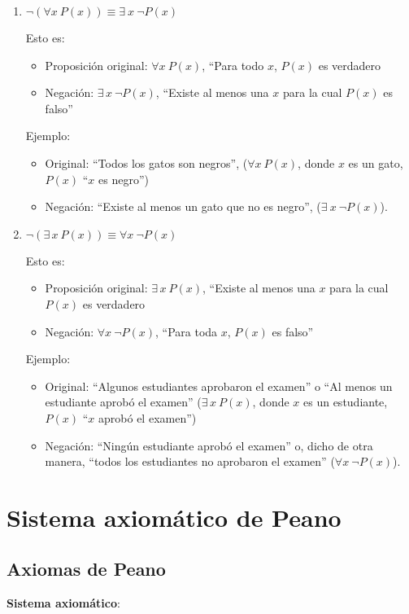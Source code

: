\begin{enumerate}[label=\roman*)]
	\item $\neg \left( \forall x \ P(x) \right) \equiv \exists \ x \ \neg P(x)$
	
	Esto es:
	\begin{itemize}
		\item Proposición original: $\forall x \ P(x)$, ``Para todo $x$, $P(x)$ es verdadero
		\item Negación: $\exists \, x \ \neg P(x)$, ``Existe al menos una $x$ para la cual $P(x)$ es falso''
	\end{itemize}
	Ejemplo:
	\begin{itemize}
		\item Original: ``Todos los gatos son negros'', ($\forall x \ P(x)$, donde $x$ es un gato, $P(x)$ ``$x$ es negro'')
		\item Negación: ``Existe al menos un gato que no es negro'', ($\exists \ x \ \neg P(x)$).
	\end{itemize}
	\item $\neg \left( \exists \, x \ P(x) \right) \equiv \forall x \ \neg P(x)$
	
	Esto es:
	\begin{itemize}
		\item Proposición original: $\exists \, x \ P(x)$, ``Existe al menos una $x$ para la cual $P(x)$ es verdadero
		\item Negación: $\forall x \ \neg P(x)$, ``Para toda $x$, $P(x)$ es falso'' 
	\end{itemize}
	Ejemplo:
	\begin{itemize}
		\item Original: ``Algunos estudiantes aprobaron el examen'' o ``Al menos un estudiante aprobó el examen'' ($\exists \, x \ P(x)$, donde $x$ es un estudiante, $P(x)$ ``$x$ aprobó el examen'')
		\item Negación: ``Ningún estudiante aprobó el examen'' o, dicho de otra manera, ``todos los estudiantes no aprobaron el examen'' ($\forall x \ \neg P(x)$).
	\end{itemize}
\end{enumerate}


\section{Sistema axiomático de Peano}

\subsection{Axiomas de Peano} \label{sec:peano}
\textbf{Sistema axiomático}:

